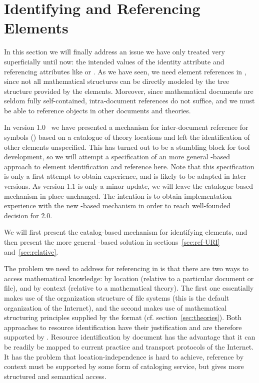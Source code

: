 \section{Identifying and Referencing {\else{\omdoc}\fi} Elements}\label{sec:catalogue}

In this section we will finally address an issue we have only treated very
superficially until now: the intended values of the identity attribute
{} and referencing attributes like {} or
{}. As we have seen, we need element references in {\omdoc},
since not all mathematical structures can be directly modeled by the {\xml} tree
structure provided by the {\omdoc} elements.  Moreover, since mathematical
documents are seldom fully self-contained, intra-document references do not
suffice, and we must be able to reference objects in other documents and theories.
  
In {\omdoc} version 1.0~\cite{Kohlhase:otormd00} we have presented a mechanism for
inter-document reference for {\openmath} symbols ({}) based on a
catalogue of theory locations and left the identification of other {\omdoc}
elements unspecified. This has turned out to be a stumbling block for tool
development, so we will attempt a specification of an more general
{}-based approach to element identification and reference here. Note
that this specification is only a first attempt to obtain experience, and is
likely to be adapted in later versions. As version 1.1 is only a minor update, we
will leave the catalogue-based mechanism in place unchanged. The intention is to
obtain implementation experience with the new {}-based mechanism in
order to reach well-founded decision for {\omdoc} 2.0.
  
We will first present the catalog-based mechanism for identifying {}
elements, and then present the more general {}-based solution in
sections~\ref{sec:ref-URI} and~\ref{sec:relative}.
 
The problem we need to address for referencing in {\omdoc} is that there are two
ways to access mathematical knowledge: by location (relative to a particular
document or file), and by context (relative to a mathematical theory). The first
one essentially makes use of the organization structure of file systems (this is
the default organization of the Internet), and the second makes use of
mathematical structuring principles supplied by the {\omdoc} format (cf.
section~\ref{sec:theories}). Both approaches to resource identification have their
justification and are therefore supported by {\omdoc}. Resource identification by
document has the advantage that it can be readily be mapped to current practice
and transport protocols of the Internet.  It has the problem that
location-independence is hard to achieve, reference by context must be supported
by some form of cataloging service, but gives more structured and semantical
access.

